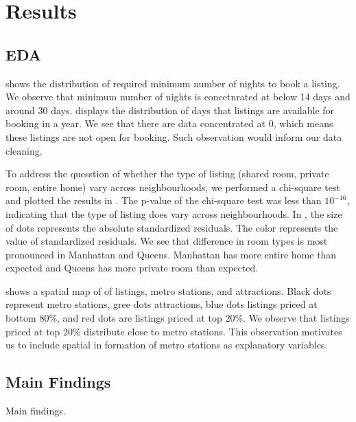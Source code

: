 \documentclass[10pt]{jmlr}%
\begin{document}
\section{Results}
\label{sec:results}

\subsection{EDA}

 shows the distribution of required minimum number of nights to book a listing. We observe that minimum number of nights is concetnrated at below 14 days and around 30 days.  displays the distribution of days that listings are available for booking in a year. We see that there are data concentrated at 0, which means these listings are not open for booking. Such observation would inform our data cleaning.

To address the quesstion of whether the type of listing (shared room, private room, entire home) vary across neighbourhoods, we performed a chi-square test and plotted the results in . The p-value of the chi-square test was less than $10^{-16}$, indicating that the type of listing does vary across neighbourhoods. In , the size of dots represents the absolute standardized residuals. The color represents the value of standardized residuals. We see that difference in room types is most pronounced in Manhattan and Queens. Manhattan has more entire home than expected and Queens has more private room than expected.

 shows a spatial map of  of listings, metro stations, and attractions. Black dots represent metro stations, gree dots attractions, blue dots listings priced at bottom 80\%, and red dots are listings priced at top 20\%. We observe that listings priced at top 20\% distribute close to metro stations. This observation motivates us to include spatial in formation of metro stations as explanatory variables.



\subsection{Main Findings}
Main findings.
\end{document}
